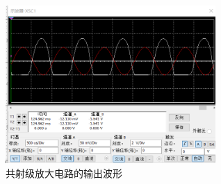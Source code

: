 \documentclass[10pt, conference, compsocconf, a4paper]{IEEEtran}
\begin{document}
\begin{figure}[H]
  \includegraphics[width=8cm]{img/d.png}
  \caption{共射级放大电路的输出波形}
\end{figure}
\end{document}
